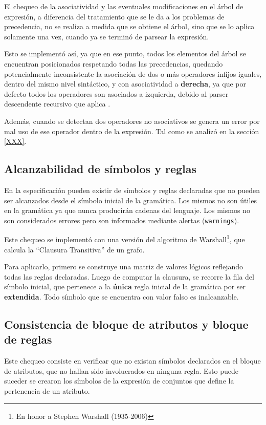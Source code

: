 El chequeo de la asociatividad y las eventuales modificaciones en el árbol de expresión, a diferencia del tratamiento que se le da a los problemas de precedencia, no se realiza a medida que se obtiene el árbol, sino que se lo aplica solamente una vez, cuando ya se terminó de parsear la expresión.

Esto se implementó así, ya que en ese punto, todos los elementos del árbol se encuentran posicionados respetando todas las precedencias, quedando potencialmente inconsistente la asociación de dos o más operadores infijos iguales, dentro del mismo nivel sintáctico, y con asociatividad a \textbf{derecha}, ya que por defecto todos los operadores son asociados a izquierda, debido al parser descendente recursivo que aplica \spirit.

Además, cuando se detectan dos operadores no asociativos se genera un error por mal uso de ese operador dentro de la expresión. Tal como se analizó en la sección \ref{XXX}.

\subsection{Alcanzabilidad de símbolos y reglas}

En la especificación pueden existir de símbolos y reglas declaradas que no pueden ser alcanzados desde el símbolo inicial de la gramática. Los mismos no son útiles en la gramática ya que nunca producirán cadenas del lenguaje. Los mismos no son considerados errores pero son informados mediante alertas (\texttt{warnings}).

Este chequeo se implementó con una versión del algoritmo de Warshall\footnote{En honor a Stephen Warshall (1935-2006)}, que calcula la ``Clausura Transitiva'' de un grafo.

Para aplicarlo, primero se construye una matriz de valores lógicos reflejando todas las reglas declaradas. Luego de computar la clausura, se recorre la fila del símbolo inicial, que pertenece a la \textbf{única} regla inicial de la gramática por ser \textbf{extendida}. Todo símbolo que se encuentra con valor falso es inalcanzable.

\subsection{Consistencia de bloque de atributos y bloque de reglas}

Este chequeo consiste en verificar que no existan símbolos declarados en el bloque de atributos, que no hallan sido involucrados en ninguna regla. Esto puede suceder se crearon los símbolos de la expresión de conjuntos que define la pertenencia de un atributo.

